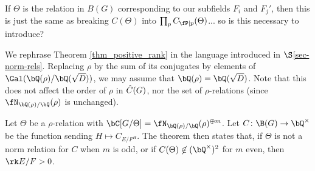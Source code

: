{\color{red} If $\Theta$ is the relation in $B(G)$ corresponding to our subfields $F_i$ and $F_j'$, then this is just the same as breaking $C(\Theta)$ into $\prod_p C_{\fP \mid p}(\Theta)$... so is this necessary to introduce?}

\begin{rem}\label{rephrase-thm}
We rephrase Theorem \ref{thm_positive_rank} in the language introduced in $\S$\ref{sec-norm-rels}. 
Replacing $\rho$ by the sum of its conjugates by elements of $ \Gal(\bQ(\rho) / \bQ(\sqrt{D}))$, we may assume that $\bQ(\rho) = \bQ(\sqrt{D})$. Note that this does not affect the order of $\rho$ in $\hat{C}(G)$, nor the set of $\rho$-relations (since $\repnorm{\rho}$ is unchanged). 

Let $\Theta$ be a $\rho$-relation with $\bC[G / \Theta] = \repnorm{\rho}^{\oplus m}$. Let $C \colon \B(G) \to \bQ^{\times}$ be the function sending $H \mapsto C_{E / F^H}$. The theorem then states that, if $\Theta$ is not a norm relation for $C$ when $m$ is odd, or if $C(\Theta) \not\in (\bQ^{\times})^2$ for $m$ even, then $ \rk E / F > 0$. 
\end{rem}




